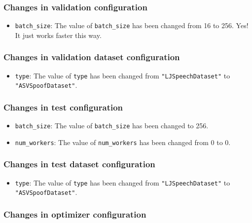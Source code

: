 \documentclass[a4paper]{article}
\begin{document}
\subsubsection{Changes in validation configuration}

\begin{itemize}
    \item \texttt{batch\_size}: The value of \texttt{batch\_size} has been changed from 16 to 256. Yes! It just works faster this way.
\end{itemize}

\subsubsection{Changes in validation dataset configuration}

\begin{itemize}
    \item \texttt{type}: The value of \texttt{type} has been changed from \texttt{"LJSpeechDataset"} to \texttt{"ASVSpoofDataset"}.
\end{itemize}

\subsubsection{Changes in test configuration}

\begin{itemize}
    \item \texttt{batch\_size}: The value of \texttt{batch\_size} has been changed to 256.
    \item \texttt{num\_workers}: The value of \texttt{num\_workers} has been changed from 0 to 0.
\end{itemize}

\subsubsection{Changes in test dataset configuration}

\begin{itemize}
    \item \texttt{type}: The value of \texttt{type} has been changed from \texttt{"LJSpeechDataset"} to \texttt{"ASVSpoofDataset"}.
\end{itemize}

\subsubsection{Changes in optimizer configuration}
\end{document}
